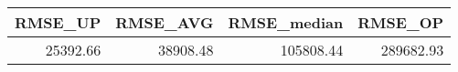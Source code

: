 \begin{tabular}{rrrr}
\toprule
 RMSE\_UP &  RMSE\_AVG &  RMSE\_median &   RMSE\_OP \\
\midrule
25392.66 &  38908.48 &    105808.44 & 289682.93 \\
\bottomrule
\end{tabular}
